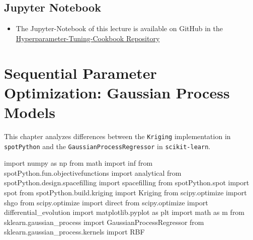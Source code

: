 \documentclass[
  letterpaper,
  DIV=11,
  numbers=noendperiod]{scrreprt}
\newenvironment{Shaded}{\begin{snugshade}}{\end{snugshade}}
\newcommand{\ImportTok}[1]{\textcolor[rgb]{0.00,0.46,0.62}{#1}}
\newcommand{\NormalTok}[1]{\textcolor[rgb]{0.00,0.23,0.31}{#1}}
\providecommand{\tightlist}{%
  \setlength{\itemsep}{0pt}\setlength{\parskip}{0pt}}\usepackage{longtable,booktabs,array}
\begin{document}
\section{Jupyter Notebook}\label{jupyter-notebook-9}

\begin{tcolorbox}[enhanced jigsaw, rightrule=.15mm, coltitle=black, title=\textcolor{quarto-callout-note-color}{\faInfo}\hspace{0.5em}{Note}, opacitybacktitle=0.6, bottomrule=.15mm, opacityback=0, left=2mm, colback=white, leftrule=.75mm, colframe=quarto-callout-note-color-frame, colbacktitle=quarto-callout-note-color!10!white, toprule=.15mm, toptitle=1mm, bottomtitle=1mm, titlerule=0mm, breakable, arc=.35mm]

\begin{itemize}
\tightlist
\item
  The Jupyter-Notebook of this lecture is available on GitHub in the
  \href{https://github.com/sequential-parameter-optimization/Hyperparameter-Tuning-Cookbook/blob/main/010_num_spot_sklearn_surrogate.ipynb}{Hyperparameter-Tuning-Cookbook
  Repository}
\end{itemize}

\end{tcolorbox}

\chapter{Sequential Parameter Optimization: Gaussian Process
Models}\label{sec-gaussian-process-models}

This chapter analyzes differences between the \texttt{Kriging}
implementation in \texttt{spotPython} and the
\texttt{GaussianProcessRegressor} in \texttt{scikit-learn}.

\begin{Shaded}
\begin{Highlighting}[]
\ImportTok{import}\NormalTok{ numpy }\ImportTok{as}\NormalTok{ np}
\ImportTok{from}\NormalTok{ math }\ImportTok{import}\NormalTok{ inf}
\ImportTok{from}\NormalTok{ spotPython.fun.objectivefunctions }\ImportTok{import}\NormalTok{ analytical}
\ImportTok{from}\NormalTok{ spotPython.design.spacefilling }\ImportTok{import}\NormalTok{ spacefilling}
\ImportTok{from}\NormalTok{ spotPython.spot }\ImportTok{import}\NormalTok{ spot}
\ImportTok{from}\NormalTok{ spotPython.build.kriging }\ImportTok{import}\NormalTok{ Kriging}
\ImportTok{from}\NormalTok{ scipy.optimize }\ImportTok{import}\NormalTok{ shgo}
\ImportTok{from}\NormalTok{ scipy.optimize }\ImportTok{import}\NormalTok{ direct}
\ImportTok{from}\NormalTok{ scipy.optimize }\ImportTok{import}\NormalTok{ differential\_evolution}
\ImportTok{import}\NormalTok{ matplotlib.pyplot }\ImportTok{as}\NormalTok{ plt}
\ImportTok{import}\NormalTok{ math }\ImportTok{as}\NormalTok{ m}
\ImportTok{from}\NormalTok{ sklearn.gaussian\_process }\ImportTok{import}\NormalTok{ GaussianProcessRegressor}
\ImportTok{from}\NormalTok{ sklearn.gaussian\_process.kernels }\ImportTok{import}\NormalTok{ RBF}
\end{Highlighting}
\end{Shaded}
\end{document}
